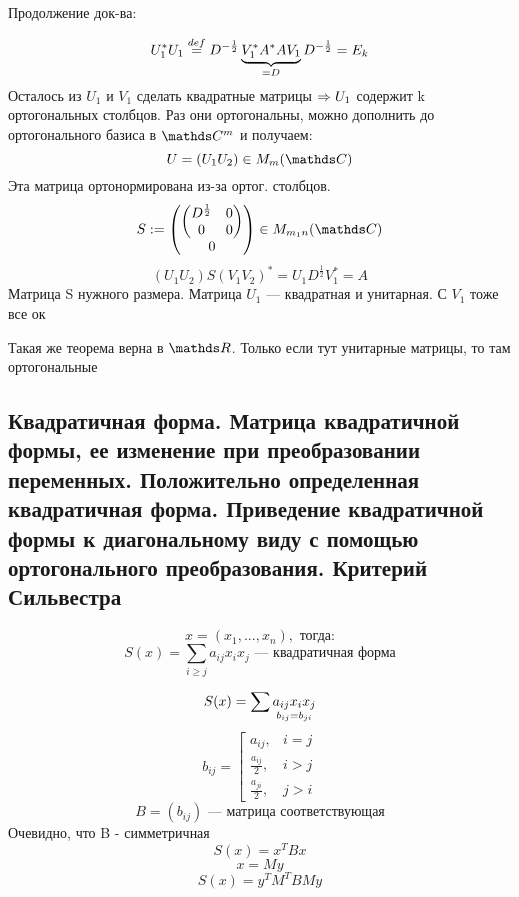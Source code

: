 \documentclass[main]{subfiles}
\begin{document}
    Продолжение док-ва:
    \begin{Proof}
        \[U_1^* U_1 \os{def}{=} D^{-\frac{1}{2}} \ub{=D}{V_1^* A^* A V_1} D^{-\frac{1}{2}} = E_k\]
        Осталось из $U_1$ и $V_1$ сделать квадратные матрицы $\Ra U_1$ содержит k ортогональных столбцов. Раз они ортогональны, можно дополнить до ортогонального базиса в $\CC^m$ и получаем:
        \[U=(U_1 U_2) \in M_m(\CC)\]
        Эта матрица ортонормирована из-за ортог. столбцов.
        \[S:=\begin{pmatrix}
        \begin{pmatrix}
        D^{\frac{1}{2}} & 0\\
        0 & 0
        \end{pmatrix}\\
        0
        \end{pmatrix} \in M_{m_1 n}(\CC)\]
        \[(U_1 U_2) S (V_1 V_2)^* = U_1 D^{\frac{1}{2}} V_1^* = A\]
        Матрица S нужного размера. Матрица $U_1$ --- квадратная и унитарная. С $V_1$ тоже все ок
    \end{Proof}

    \begin{remark}
        Такая же теорема верна в $\R$. Только если тут унитарные матрицы, то там ортогональные
    \end{remark}

    \subsection{Квадратичная форма. Матрица квадратичной формы, ее изменение при преобразовании переменных. Положительно определенная квадратичная форма. Приведение квадратичной формы к диагональному виду с помощью ортогонального преобразования. Критерий Сильвестра}
    \begin{Definition}
        \[x=(x_1,...,x_n),\text{ тогда:}\]
        \[S(x) = \sum_{i \geq j} a_{ij} x_i x_j \text{ --- квадратичная форма}\]
    \end{Definition}

    \begin{Remark}
        \[S(x) = \sum \us{b_{ij} = b_{ji}}{a_{ij} x_i x_j}\]
        \[b_{ij} = \left[\begin{matrix}
            a_{ij}, & i=j\\
            \frac{a_{ij}}{2}, & i > j\\
            \frac{a_{ji}}{2}, & j>i
        \end{matrix}\right.\]
        \[B=(b_{ij}) \text{ --- матрица соответствующая}\]
        Очевидно, что B - симметричная
        \[S(x) = x^T B x\]
        \[x = My\]
        \[S(x) = y^T M^T B My\]
    \end{Remark}
\end{document}
